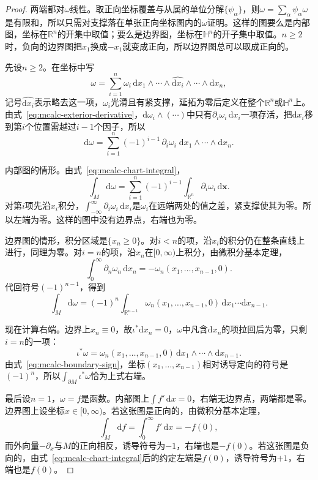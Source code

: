 \begin{proof}
两端都对$\omega$线性。取正向坐标覆盖与从属的单位分解$\{\psi_\alpha\}$，则$\omega=\sum_\alpha\psi_\alpha\omega$是有限和，所以只需对支撑落在单张正向坐标图内的$\omega$证明。这样的图要么是内部图，坐标在$\mathbb R^n$的开集中取值；要么是边界图，坐标在$\mathbb H^n$的开子集中取值。$n\geq2$时，负向的边界图把$x_1$换成$-x_1$就变成正向，所以边界图总可以取成正向的。

先设$n\geq2$。在坐标中写
\[
\omega=\sum_{i=1}^n\omega_i\,\mathrm dx_1\wedge\cdots\wedge\widehat{\mathrm dx_i}\wedge\cdots\wedge\mathrm dx_n ,
\]
记号$\widehat{\mathrm dx_i}$表示略去这一项，$\omega_i$光滑且有紧支撑，延拓为零后定义在整个$\mathbb R^n$或$\mathbb H^n$上。由式~\eqref{eq:mcalc-exterior-derivative}，$\mathrm d\omega_i\wedge(\cdots)$中只有$\partial_i\omega_i\,\mathrm dx_i$一项存活，把$\mathrm dx_i$移到第$i$个位置需越过$i-1$个因子，所以
\[
\mathrm d\omega=\sum_{i=1}^n(-1)^{i-1}\,\partial_i\omega_i\;\mathrm dx_1\wedge\cdots\wedge\mathrm dx_n .
\]

内部图的情形。由式~\eqref{eq:mcalc-chart-integral}，
\[
\int_M\mathrm d\omega=\sum_{i=1}^n(-1)^{i-1}\int_{\mathbb R^n}\partial_i\omega_i\,\mathrm d\bm x .
\]
对第$i$项先沿$x_i$积分，$\int_{-\infty}^\infty\partial_i\omega_i\,\mathrm dx_i$是$\omega_i$在远端两处的值之差，紧支撑使其为零。所以左端为零。这样的图中没有边界点，右端也为零。

边界图的情形，积分区域是$\{x_n\geq0\}$。对$i<n$的项，沿$x_i$的积分仍在整条直线上进行，同理为零。对$i=n$的项，沿$x_n$在$[0,\infty)$上积分，由微积分基本定理，
\[
\int_0^\infty\partial_n\omega_n\,\mathrm dx_n=-\omega_n(x_1,\ldots,x_{n-1},0).
\]
代回符号$(-1)^{n-1}$，得到
\[
\int_M\mathrm d\omega=(-1)^n\int_{\mathbb R^{n-1}}\omega_n(x_1,\ldots,x_{n-1},0)\,\mathrm dx_1\cdots\mathrm dx_{n-1}.
\]

现在计算右端。边界上$x_n\equiv0$，故$\iota^*\mathrm dx_n=0$，$\omega$中凡含$\mathrm dx_n$的项拉回后为零，只剩$i=n$的一项：
\[
\iota^*\omega=\omega_n(x_1,\ldots,x_{n-1},0)\,\mathrm dx_1\wedge\cdots\wedge\mathrm dx_{n-1}.
\]
由式~\eqref{eq:mcalc-boundary-sign}，坐标$(x_1,\ldots,x_{n-1})$相对诱导定向的符号是$(-1)^n$，所以$\int_{\partial M}\iota^*\omega$恰为上式右端。

最后设$n=1$，$\omega=f$是函数。内部图上$\int f'\,\mathrm dx=0$，右端无边界点，两端都是零。边界图上设坐标$x\in[0,\infty)$。若这张图是正向的，由微积分基本定理，
\[
\int_M\mathrm df=\int_0^\infty f'\,\mathrm dx=-f(0),
\]
而外向量$-\partial_x$与$M$的正向相反，诱导符号为$-1$，右端也是$-f(0)$。若这张图是负向的，由式~\eqref{eq:mcalc-chart-integral}后的约定左端是$f(0)$，诱导符号为$+1$，右端也是$f(0)$。
\end{proof}

